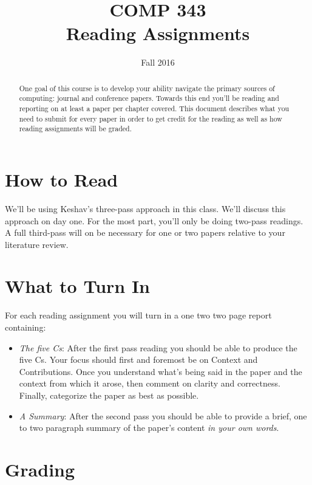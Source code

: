 \documentclass[10pt]{article}
\title{COMP 343 \\ Reading Assignments}
\author{  }
\date{Fall 2016}
\begin{document}
\maketitle

\begin{abstract}
  One goal of this course is to develop your ability navigate the primary sources of computing: journal and conference papers. Towards this end you'll be reading and reporting on at least a paper per chapter covered. This document describes what you need to submit for every paper in order to get credit for the reading as well as how reading assignments will be graded.
\end{abstract}

\section{How to Read}

We'll be using Keshav's three-pass approach in this class\cite{Keshav}. We'll discuss this approach on day one. For the most part, you'll only be doing two-pass readings. A full third-pass will on be necessary for one or two papers relative to your literature review.

\section{What to Turn In}

For each reading assignment you will turn in a one two two page report containing:
\begin{itemize}
  \item \textit{The five Cs}: \newline After the first pass reading you should be able to produce the five Cs. Your focus should first and foremost be on Context and Contributions. Once you understand what's being said in the paper and the context from which it arose, then comment on clarity and correctness. Finally, categorize the paper as best as possible.
  \item \textit{A Summary}: \newline After the second pass you should be able to provide a brief, one to two paragraph summary of the paper's content \textit{in your own words}.
\end{itemize}

\section{Grading}
\end{document}
